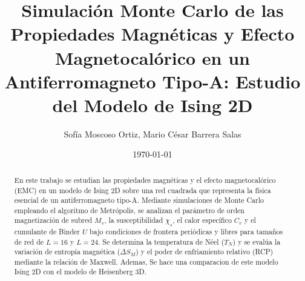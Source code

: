 \documentclass[twocolumn,showpacs,preprintnumbers,amsmath,amssymb,aps,prb]{revtex4-1}
\begin{document}
\title{Simulación Monte Carlo de las Propiedades Magnéticas y Efecto Magnetocalórico en un Antiferromagneto Tipo-A: Estudio del Modelo de Ising 2D}

\author{Sofía Moscoso Ortiz, Mario César Barrera Salas}
\date{\today}

\begin{abstract}
En este trabajo se estudian las propiedades magnéticas y el efecto magnetocalórico (EMC) en un modelo de Ising 2D sobre una red cuadrada que representa la física esencial de un antiferromagneto tipo-A. Mediante simulaciones de Monte Carlo empleando el algoritmo de Metrópolis, se analizan el parámetro de orden magnetización de subred $M_s$, la susceptibilidad $\chi_s$, el calor específico $C_v$ y el cumulante de Binder $U$ bajo condiciones de frontera periódicas y libres para tamaños de red de $L=16$ y $L=24$. Se determina la temperatura de Néel ($T_N$) y se evalúa la variación de entropía magnética ($\Delta S_M$) y el poder de enfriamiento relativo (RCP) mediante la relación de Maxwell. Ademas, Se hace una comparacion de este modelo Ising 2D con el modelo de Heisenberg 3D. 
\end{abstract}
\maketitle







\clearpage
\appendix

\end{document}
